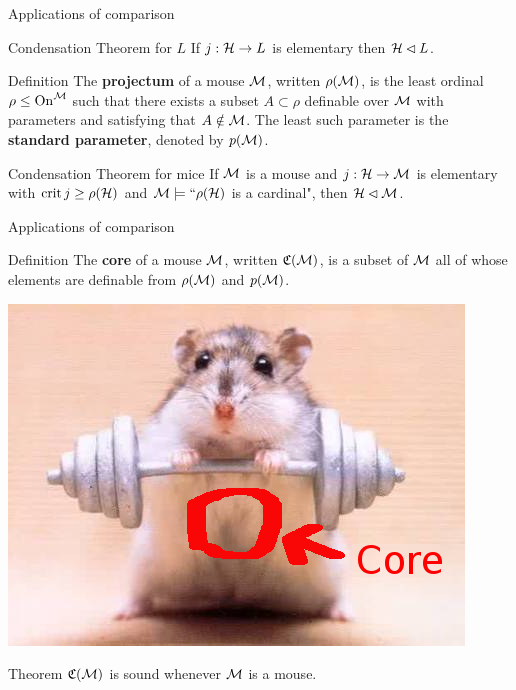 \begin{frame}{Applications of comparison}
\pause\begin{block}{Condensation Theorem for $L$}
If $j:\mathcal{H}\to L$ is elementary then $\mathcal{H}\lhd L$.\\
\end{block}

\pause\begin{block}{Definition}
The \textbf{projectum} of a mouse $\operatorname{\mathcal{M}}$, written $\rho(\operatorname{\mathcal{M}})$, is the least ordinal $\rho\leq\operatorname{On}^{\operatorname{\mathcal{M}}}$ such that there exists a subset $A\subset\rho$ definable over $\operatorname{\mathcal{M}}$ with parameters and satisfying that $A\notin\operatorname{\mathcal{M}}$. The least such parameter is the \textbf{standard parameter}, denoted by $p(\operatorname{\mathcal{M}})$.\\
\end{block}

\pause\begin{block}{Condensation Theorem for mice}
If $\operatorname{\mathcal{M}}$ is a mouse and $j:\mathcal{H}\to\operatorname{\mathcal{M}}$ is elementary with $\operatorname{crit} j\geq\rho(\mathcal{H})$ and $\operatorname{\mathcal{M}}\models``\rho(\mathcal{H})$ is a cardinal", then $\mathcal{H}\lhd\operatorname{\mathcal{M}}$.
\end{block}
\end{frame}

\begin{frame}{Applications of comparison}
\begin{block}{Definition}
The \textbf{core} of a mouse $\operatorname{\mathcal{M}}$, written $\mathfrak C(\operatorname{\mathcal{M}})$, is a subset of $\operatorname{\mathcal{M}}$ all of whose elements are definable from $\rho(\operatorname{\mathcal{M}})$ and $p(\operatorname{\mathcal{M}})$.\\
\end{block}

\begin{center}\includegraphics[scale=0.35]{gfx/coremouse.png}\end{center}


\pause\begin{block}{Theorem}
$\mathfrak C(\operatorname{\mathcal{M}})$ is {\color{orange}sound} whenever $\operatorname{\mathcal{M}}$ is a mouse.
\end{block}
\end{frame}

